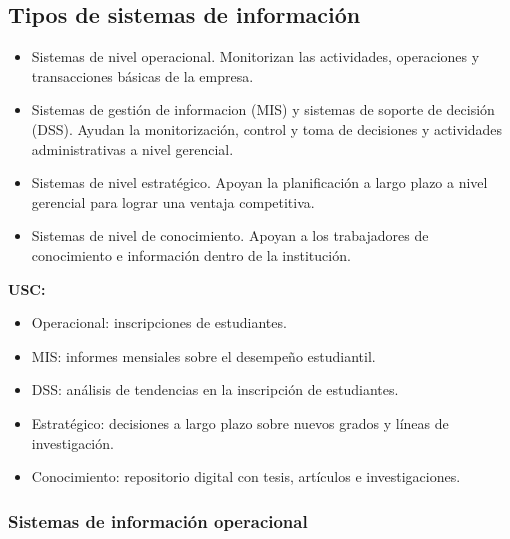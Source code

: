 \subsection{Tipos de sistemas de información}

\begin{itemize}
\item Sistemas de nivel operacional. Monitorizan las actividades, operaciones y transacciones básicas de la empresa. 
\item Sistemas de gestión de informacion (MIS) y sistemas de soporte de decisión (DSS). Ayudan la monitorización, control y toma de decisiones y actividades administrativas a nivel gerencial. 
\item Sistemas de nivel estratégico. Apoyan la planificación a largo plazo a nivel gerencial para lograr una ventaja competitiva.
\item Sistemas de nivel de conocimiento. Apoyan a los trabajadores de conocimiento e información dentro de la institución.
\end{itemize}

\begin{example}
\textbf{USC:}
\begin{itemize}
\item Operacional: inscripciones de estudiantes.
\item MIS: informes mensiales sobre el desempeño estudiantil.
\item DSS: análisis de tendencias en la inscripción de estudiantes.
\item Estratégico: decisiones a largo plazo sobre nuevos grados y líneas de investigación.
\item Conocimiento: repositorio digital con tesis, artículos e investigaciones.
\end{itemize}
\end{example}

\subsubsection{Sistemas de información operacional}

